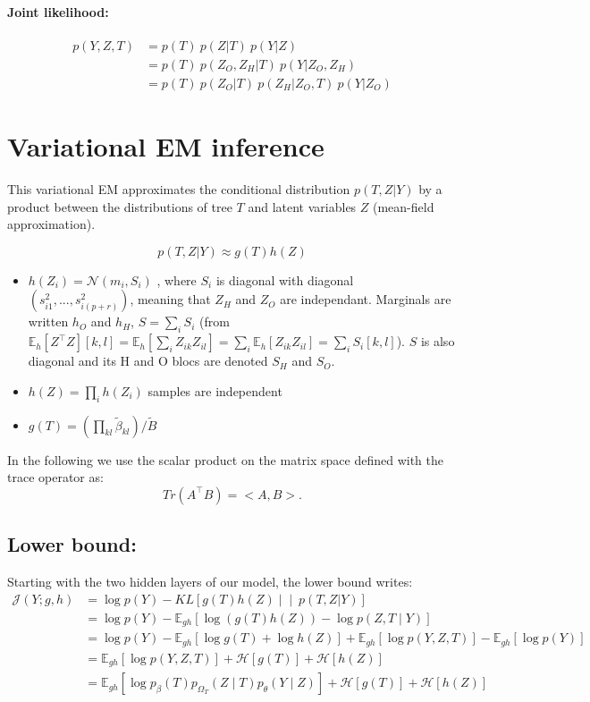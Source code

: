\documentclass[11pt,a4paper]{article}
\newcommand{\Esp}{\mathds{E}}
\newcommand{\entr}{\mathcal{H}}
\begin{document}
\paragraph{Joint likelihood:}
\begin{align*}
p(Y,Z,T)& = p(T) \: p(Z|T) \: p(Y|Z) \\
&= p(T)\: p(Z_O,Z_H|T) \: p(Y|Z_O,Z_H) \\
&= p(T) \: p(Z_O|T) \: p(Z_H | Z_O,T)  \: p(Y|Z_O)
\end{align*} 
\section{Variational EM inference}

This variational EM approximates the conditional distribution $p(T,Z | Y)$ by a product  between the  distributions of tree $T$ and latent variables $Z$ (mean-field approximation).

$$p(T,Z | Y) \approx  g(T)h(Z)$$
\begin{itemize}
\item $ h(Z_i) =  \mathcal{N}(m_i,S_i)$ , where $S_i$ is diagonal with diagonal $(s_{i1}^2, ... , s_{i(p+r)}^2)$, meaning that $Z_H$ and $Z_O$ are independant. Marginals are written $h_O$  and  $h_H$, $S=\sum_i S_i$  (from $\Esp_h[Z^\intercal Z][k,l] = \Esp_h[\sum_i Z_{ik} Z_{il}] = \sum_i \Esp_h[Z_{ik}Z_{il}] = \sum_i S_i[k,l]$). $S$ is also diagonal and its H and O blocs are denoted $S_H$ and $S_O$.
\item $ h(Z) = \prod_i h(Z_i)$ samples are independent 
\item $ g(T) = \left(\prod_{kl} \widetilde{\beta}_{kl} \right) / \widetilde{B}$
\end{itemize}

In the following we use the scalar product on the matrix space defined with the trace operator as: 
$$  Tr(A^\intercal B) = <A,B> .$$
\subsection{Lower bound:}
Starting with the two hidden layers of our model, the lower bound writes:
\begin{align*}
\mathcal{J}(Y; g,h)&=\log p(Y) - KL\left[g(T) h(Z) \middle\vert\middle\vert\ p(T,Z | Y)\right]\\
&= \log p(Y) - \Esp_{gh}[\log( g(T) h(Z)) - \log p(Z,T\mid Y) ]\\
&= \log p(Y) - \Esp_{gh}[\log g(T) + \log h(Z) ] + \Esp_{gh}[\log p(Y,Z,T)] - \Esp_{gh}[\log p(Y)]\\
&= \Esp_{gh} [\log p(Y,Z,T)] + \entr[g(T)] + \entr[h(Z)]\\
&= \Esp_{gh} [\log p_\beta(T)p_{\Omega_T}(Z\mid T)p_\theta(Y\mid Z)] + \entr[g(T)] + \entr[h(Z)]
\end{align*}
\end{document}
